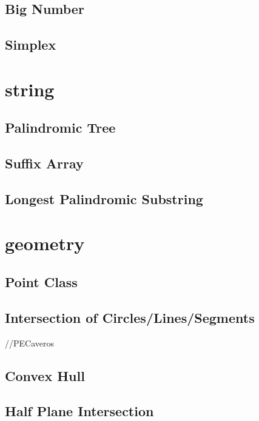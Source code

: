\documentclass[10pt,twocolumn,oneside]{article}
\begin{document}
\subsection{Big Number}

\subsection{Simplex}


\section{string}
\subsection{Palindromic Tree}

\subsection{Suffix Array}

\subsection{Longest Palindromic Substring}


\section{geometry}
\subsection{Point Class}

\subsection{Intersection of Circles/Lines/Segments}
//PECaveros




\subsection{Convex Hull}

\subsection{Half Plane Intersection}

\end{document}
